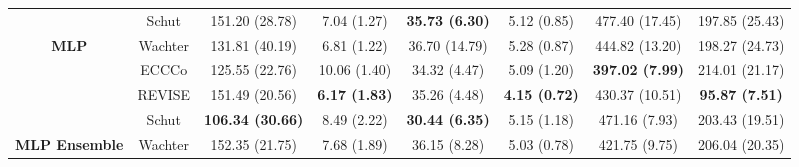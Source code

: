 \begin{table}
{\begin{tabular}[t]{>{}cccccccc}
 & Schut & 151.20 (28.78) & 7.04 (1.27) & \textbf{35.73 (6.30)} & 5.12 (0.85) & 477.40 (17.45) & 197.85 (25.43)\\

\multirow{-4}{*}{\centering\arraybackslash \textbf{MLP}} & Wachter & 131.81 (40.19) & 6.81 (1.22) & 36.70 (14.79) & 5.28 (0.87) & 444.82 (13.20) & 198.27 (24.73)\\
\cmidrule{1-8}
 & ECCCo & 125.55 (22.76) & 10.06 (1.40) & 34.32 (4.47) & 5.09 (1.20) & \textbf{397.02 (7.99)} & 214.01 (21.17)\\

 & REVISE & 151.49 (20.56) & \textbf{6.17 (1.83)} & 35.26 (4.48) & \textbf{4.15 (0.72)} & 430.37 (10.51) & \textbf{95.87 (7.51)}\\

 & Schut & \textbf{106.34 (30.66)} & 8.49 (2.22) & \textbf{30.44 (6.35)} & 5.15 (1.18) & 471.16 (7.93) & 203.43 (19.51)\\

\multirow{-4}{*}{\centering\arraybackslash \textbf{MLP Ensemble}} & Wachter & 152.35 (21.75) & 7.68 (1.89) & 36.15 (8.28) & 5.03 (0.78) & 421.75 (9.75) & 206.04 (20.35)\\
\bottomrule
\end{tabular}}
\end{table}
